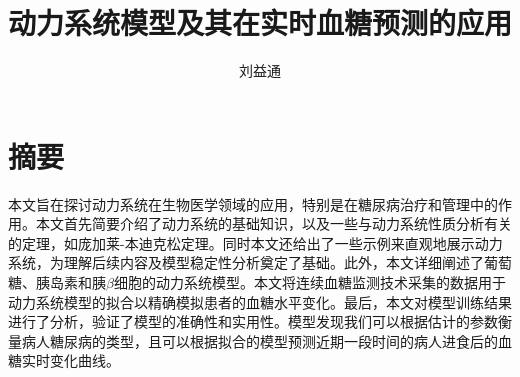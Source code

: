 \confidential{}%
\title{动力系统模型及其在实时血糖预测的应用}%
\author{刘益通}%
\advisorsec{}%
\englishdate{\quad / \quad /\quad}%

\chapter*{摘\quad 要}%
\setcounter{page}{1}%

本文旨在探讨动力系统在生物医学领域的应用，特别是在糖尿病治疗和管理中的作用。本文首先简要介绍了动力系统的基础知识，以及一些与动力系统性质分析有关的定理，如庞加莱-本迪克松定理。同时本文还给出了一些示例来直观地展示动力系统，为理解后续内容及模型稳定性分析奠定了基础。此外，本文详细阐述了葡萄糖、胰岛素和胰$\beta$细胞的动力系统模型。本文将连续血糖监测技术采集的数据用于动力系统模型的拟合以精确模拟患者的血糖水平变化。最后，本文对模型训练结果进行了分析，验证了模型的准确性和实用性。模型发现我们可以根据估计的参数衡量病人糖尿病的类型，且可以根据拟合的模型预测近期一段时间的病人进食后的血糖实时变化曲线。



